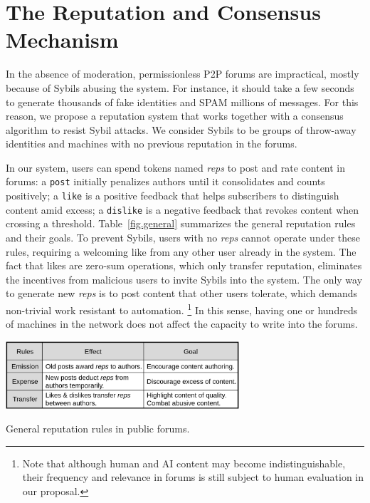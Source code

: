 \documentclass[12pt]{article}
\newcommand{\reps}     {\emph{reps}\xspace}
\newcommand{\code}[1]  {\texttt{\footnotesize{#1}}}
\begin{document}
\section{The Reputation and Consensus Mechanism}
\label{sec.design}

In the absence of moderation, permissionless P2P forums are impractical, mostly
because of Sybils abusing the system.
For instance, it should take a few seconds to generate thousands of fake
identities and SPAM millions of messages.
For this reason, we propose a reputation system that works together with a
consensus algorithm to resist Sybil attacks.
We consider Sybils to be groups of throw-away identities and machines with no
previous reputation in the forums.

In our system, users can spend tokens named \reps to post and rate content in
forums:
a \code{post} initially penalizes authors until it consolidates and counts
positively;
a \code{like} is a positive feedback that helps subscribers to distinguish
content amid excess;
a \code{dislike} is a negative feedback that revokes content when crossing a
threshold.
Table~\ref{fig.general} summarizes the general reputation rules and their
goals.
To prevent Sybils, users with no \reps cannot operate under these rules,
requiring a welcoming like from any other user already in the system.
The fact that likes are zero-sum operations, which only transfer reputation,
eliminates the incentives from malicious users to invite Sybils into the
system.
The only way to generate new \reps is to post content that other users
tolerate, which demands non-trivial work resistant to automation.%
\footnote{
    Note that although human and AI content may become indistinguishable, their
    frequency and relevance in forums is still subject to human evaluation in
    our proposal.
}
In this sense, having one or hundreds of machines in the network does not
affect the capacity to write into the forums.

\begin{table}
\centering
\includegraphics[width=0.65\textwidth]{general.png}
\caption{General reputation rules in public forums.}
\label{fig.general}
\end{table}
\end{document}
